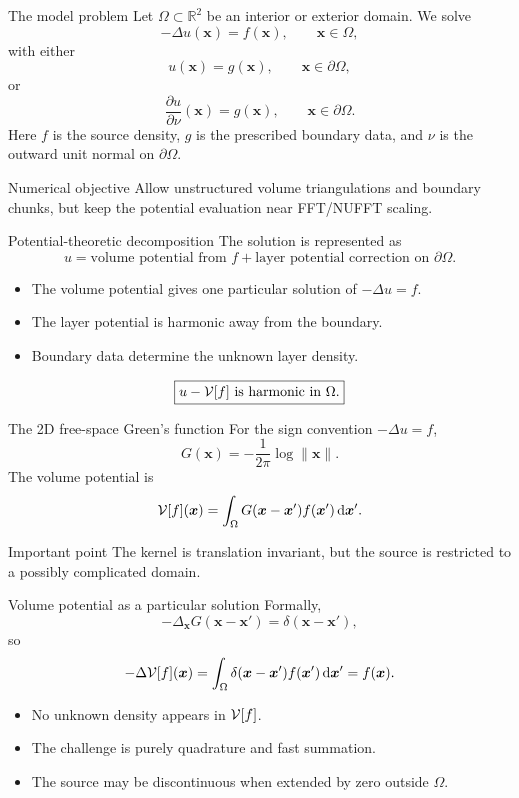 \documentclass[aspectratio=169,11pt]{beamer}
\newcommand{\R}{\mathbb{R}}
\newcommand{\dd}{\,\mathrm d}
\newcommand{\x}{\bm{x}}
\newcommand{\xp}{\bm{x}'}
\begin{document}
\begin{frame}{The model problem}
\small
Let $\Omega\subset\R^2$ be an interior or exterior domain.
We solve
\[
  -\Delta u(\x)=f(\x),\qquad \x\in\Omega,
\]
with either
\[
  u(\x)=g(\x),\qquad \x\in\partial\Omega,
\]
or
\[
  \frac{\partial u}{\partial \nu}(\x)=g(\x),\qquad \x\in\partial\Omega.
\]
Here $f$ is the source density, $g$ is the prescribed boundary data, and
$\nu$ is the outward unit normal on $\partial\Omega$.

\begin{block}{Numerical objective}
Allow unstructured volume triangulations and boundary chunks, but keep the
potential evaluation near FFT/NUFFT scaling.
\end{block}
\end{frame}

\begin{frame}{Potential-theoretic decomposition}
\small
The solution is represented as
\[
  u = \text{volume potential from } f
      + \text{layer potential correction on } \partial\Omega.
\]

\begin{itemize}
  \item The volume potential gives one particular solution of $-\Delta u=f$.
  \item The layer potential is harmonic away from the boundary.
  \item Boundary data determine the unknown layer density.
\end{itemize}

\[
  \boxed{u - \mathcal{V}[f]\text{ is harmonic in }\Omega.}
\]
\end{frame}

\begin{frame}{The 2D free-space Green's function}
\small
For the sign convention $-\Delta u=f$,
\[
  G(\x)=-\frac{1}{2\pi}\log \|\x\|.
\]
The volume potential is
\[
  \Vop[f](\x)
  =
  \int_{\Omega} G(\x-\xp) f(\xp)\dd\xp.
\]

\begin{block}{Important point}
The kernel is translation invariant, but the source is restricted to a
possibly complicated domain.
\end{block}
\end{frame}

\begin{frame}{Volume potential as a particular solution}
\small
Formally,
\[
  -\Delta_{\x} G(\x-\xp)=\delta(\x-\xp),
\]
so
\[
  -\Delta \Vop[f](\x)
  =
  \int_{\Omega} \delta(\x-\xp) f(\xp)\dd\xp
  =
  f(\x).
\]

\begin{itemize}
  \item No unknown density appears in $\mathcal{V}[f]$.
  \item The challenge is purely quadrature and fast summation.
  \item The source may be discontinuous when extended by zero outside $\Omega$.
\end{itemize}
\end{frame}
\end{document}
